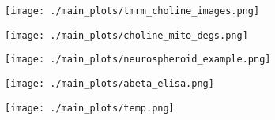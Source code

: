 \begin{figure}[ht]
\begin{subfigure}[t]{.2\textwidth}
    \end{subfigure}  
    \begin{subfigure}[t]{.3\textwidth}
        \caption{}
        \texttt{[image: ./main\_plots/tmrm\_choline\_images.png]}        
    \end{subfigure}   
    \begin{subfigure}[t]{.3\textwidth}
        \caption{}
        \texttt{[image: ./main\_plots/choline\_mito\_degs.png]}        
    \end{subfigure}   
    \begin{subfigure}[t]{.15\textwidth}
        \caption{}
        \texttt{[image: ./main\_plots/neurospheroid\_example.png]}        
    \end{subfigure} 
    \begin{subfigure}[t]{.35\textwidth}
        \caption{}
        \texttt{[image: ./main\_plots/abeta\_elisa.png]}        
    \end{subfigure}  
    \begin{subfigure}[t]{.15\textwidth}
        \caption{}
        \texttt{[image: ./main\_plots/temp.png]}        
    \end{subfigure}  







\end{figure}
